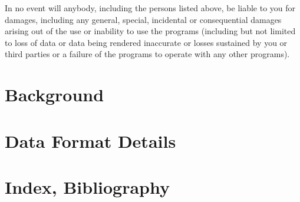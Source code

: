\documentclass{report}
\begin{document}
In no event will anybody, including the persons listed above, be
liable to you for damages, including any general, special, incidental
or consequential damages arising out of the use or inability to use
the programs (including but not limited to loss of data or data being
rendered inaccurate or losses sustained by you or third parties or a
failure of the programs to operate with any other programs).

\newpage

\tableofcontents
\newpage
\pagestyle{headings}
\setcounter{page}{1}



\chapter{Background} \label{ch:background}



























\chapter{Data Format Details} \label{chap:storage}











\chapter{Index, Bibliography}
\printindex

\end{document}
